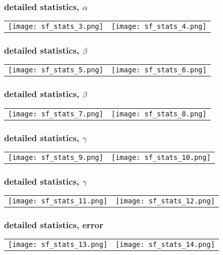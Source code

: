 	\begin{frame}
		\frametitle{\appendixname{} \textendash{} detailed statistics, $\alpha$}
		\begin{tabular}{ r r }
			\texttt{[image: sf\_stats\_3.png]} & 
			\texttt{[image: sf\_stats\_4.png]}
		\end{tabular}
	\end{frame}

	\begin{frame}
		\frametitle{\appendixname{} \textendash{} detailed statistics, $\beta$}\label{app:detstats:beta}
		\begin{tabular}{ r r }
			\texttt{[image: sf\_stats\_5.png]} & 
			\texttt{[image: sf\_stats\_6.png]}
		\end{tabular}
	\end{frame}

	\begin{frame}
		\frametitle{\appendixname{} \textendash{} detailed statistics, $\beta$}
		\begin{tabular}{ r r }
			\texttt{[image: sf\_stats\_7.png]} & 
			\texttt{[image: sf\_stats\_8.png]}
		\end{tabular}
	\end{frame}

	\begin{frame}
		\frametitle{\appendixname{} \textendash{} detailed statistics, $\gamma$}\label{app:detstats:gamma}
		\begin{tabular}{ r r }
			\texttt{[image: sf\_stats\_9.png]} & 
			\texttt{[image: sf\_stats\_10.png]}
		\end{tabular}
	\end{frame}

	\begin{frame}
		\frametitle{\appendixname{} \textendash{} detailed statistics, $\gamma$}
		\begin{tabular}{ r r }
			\texttt{[image: sf\_stats\_11.png]} & 
			\texttt{[image: sf\_stats\_12.png]}
		\end{tabular}
	\end{frame}

	\begin{frame}
		\frametitle{\appendixname{} \textendash{} detailed statistics, error}\label{app:detstats:error}
		\begin{tabular}{ r r }
			\texttt{[image: sf\_stats\_13.png]} & 
			\texttt{[image: sf\_stats\_14.png]}
		\end{tabular}
	\end{frame}

